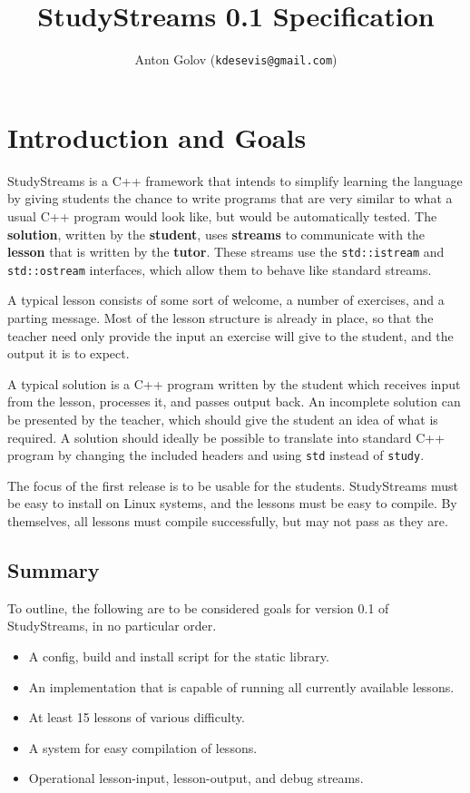 \documentclass[12pt,a4paper]{report}
\title{StudyStreams 0.1 Specification}
\author{Anton Golov (\texttt{kdesevis@gmail.com})}
\begin{document}
	\maketitle{}
	\tableofcontents{}
	\chapter{Introduction and Goals}
		StudyStreams is a C++ framework that intends to simplify learning
		the language by giving students the chance to write programs that
		are very similar to what a usual C++ program would look like, but
		would be automatically tested.  The \textbf{solution}, written by
		the \textbf{student}, uses \textbf{streams} to communicate with
		the \textbf{lesson} that is written by the \textbf{tutor}.  These
		streams use the \texttt{std::istream} and \texttt{std::ostream}
		interfaces, which allow them to behave like standard streams.

		A typical lesson consists of some sort of welcome, a number of
		exercises, and a parting message.  Most of the lesson structure is
		already in place, so that the teacher need only provide the input
		an exercise will give to the student, and the output it is to
		expect.

		A typical solution is a C++ program written by the student which
		receives input from the lesson, processes it, and passes output
		back.  An incomplete solution can be presented by the teacher,
		which should give the student an idea of what is required.  A
		solution should ideally be possible to translate into standard
		C++ program by changing the included headers and using \texttt{std}
		instead of \texttt{study}.

		The focus of the first release is to be usable for the students.
		StudyStreams must be easy to install on Linux systems, and the
		lessons must be easy to compile.  By themselves, all lessons must
		compile successfully, but may not pass as they are.

		\section{Summary}
			To outline, the following are to be considered goals for version
			0.1 of StudyStreams, in no particular order.
			\begin{itemize}
				\item A config, build and install script for the static library.
				\item An implementation that is capable of running all currently
					available lessons.
				\item At least 15 lessons of various difficulty.
				\item A system for easy compilation of lessons.
				\item Operational lesson-input, lesson-output, and debug streams.
			\end{itemize}
		
\end{document}
